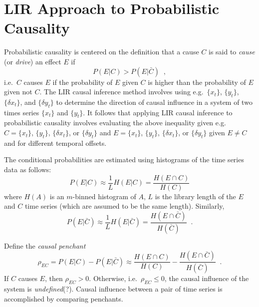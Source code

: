 \documentclass[a4paper,11pt]{article}
\begin{document}
\section{LIR Approach to Probabilistic Causality}
Probabilistic causality is centered on the definition that a cause $C$ is said to {\em cause} (or {\em drive}) an effect $E$ if
$$
P\left(E|C\right) > P\left(E|\bar{C}\right)\;\;,
$$
i.e.\ $C$ causes $E$ if the probability of $E$ given $C$ is higher than the probability of $E$ given not $C$.  The LIR causal inference method involves using e.g.\ $\{x_t\}$, $\{y_t\}$, $\{\delta x_t\}$, and $\{\delta y_t\}$ to determine the direction of causal influence in a system of two times series $\{x_t\}$ and $\{y_t\}$.  It follows that applying LIR causal inference to probabilistic causality involves evaluating the above inequality given e.g.\ $C = \{x_t\}$, $\{y_t\}$, $\{\delta x_t\}$, or $\{\delta y_t\}$ and $E = \{x_t\}$, $\{y_t\}$, $\{\delta x_t\}$, or $\{\delta y_t\}$ given $E\neq C$ and for different temporal offsets.

The conditional probabilities are estimated using histograms of the time series data as follows:
$$
P\left(E|C\right) \approx \frac{1}{L} H\left(E|C\right) = \frac{H\left(E\cap C\right)}{H(C)}
$$
where $H(A)$ is an $m$-binned histogram of $A$, $L$ is the library length of the $E$ and $C$ time series (which are assumed to be the same length).  Similarly,
$$
P\left(E|\bar{C}\right) \approx \frac{1}{L} H\left(E|\bar{C}\right) = \frac{H\left(E\cap \bar{C}\right)}{H(\bar{C})}\;\;.
$$

Define the {\em causal penchant} 
$$
\rho_{EC} = P\left(E|C\right) - P\left(E|\bar{C}\right) \approx \frac{H\left(E\cap C\right)}{H(C)}-\frac{H\left(E\cap \bar{C}\right)}{H(\bar{C})}\;\;.
$$
If $C$ causes $E$, then $\rho_{EC} > 0$.  Otherwise, i.e.\ $\rho_{EC} \le 0$, the causal influence of the system is {\em undefined}(?).  Causal influence between a pair of time series is accomplished by comparing penchants.
\end{document}
